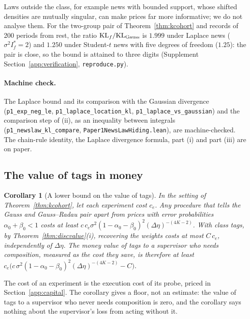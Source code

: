 \documentclass[12pt]{article}
\newtheorem{corollary}[theorem]{Corollary}
\theoremstyle{definition}
\theoremstyle{remark}
\begin{document}
Laws outside the class, for example news with bounded support, whose shifted densities are mutually singular, can make prices far more informative; we do not analyse them. For the two-group pair of Theorem~\ref{thm:kcohort} and records of 200 periods from rest, the ratio $\mathrm{KL}_f/\mathrm{KL}_{\rm Gauss}$ is $1.999$ under Laplace news ($\sigma^2I^*_f=2$) and $1.250$ under Student-$t$ news with five degrees of freedom ($1.25$): the pair is close, so the bound is attained to three digits (Supplement Section~\ref{app:verification}, \nolinkurl{reproduce.py}).

\paragraph{Machine check.} The Laplace bound and its comparison with the Gaussian divergence (\texttt{p1\_exp\_neg\_le}, \texttt{p1\_laplace\_location\_kl}, \texttt{p1\_laplace\_vs\_gaussian}) and the comparison step of (ii), as an inequality between integrals (\texttt{p1\_newslaw\_kl\_compare}, \nolinkurl{Paper1NewsLawHiding.lean}), are machine-checked. The chain-rule identity, the Laplace divergence formula, part (i) and part (iii) are on paper.

\subsection{The value of tags in money}

\begin{corollary}[A lower bound on the value of tags]\label{cor:money}
In the setting of Theorem~\ref{thm:kcohort}, let each experiment cost $c_e$. Any procedure that tells the Gauss and Gauss--Radau pair apart from prices with error probabilities $\alpha_0+\beta_0<1$ costs at least $c\,c_e\sigma^2(1-\alpha_0-\beta_0)^2(\Delta\eta)^{-(4K-2)}$. With class tags, by Theorem~\ref{thm:discvalue}(i), recovering the weights costs at most $C\,c_e$, independently of $\Delta\eta$. The money value of tags to a supervisor who needs composition, measured as the cost they save, is therefore at least $c_e\bigl(c\,\sigma^2(1-\alpha_0-\beta_0)^2(\Delta\eta)^{-(4K-2)}-C\bigr)$.
\end{corollary}

The cost of an experiment is the execution cost of its probe, priced in Section~\ref{app:capital}. The corollary gives a floor, not an estimate: the value of tags to a supervisor who never needs composition is zero, and the corollary says nothing about the supervisor's loss from acting without it.
\end{document}
